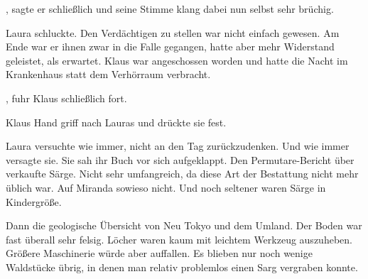 \par

, sagte er schließlich und seine Stimme klang dabei nun selbst sehr brüchig.

\par

Laura schluckte. Den Verdächtigen zu stellen war nicht einfach gewesen. Am Ende war er ihnen zwar in die Falle gegangen, hatte aber mehr Widerstand geleistet, als erwartet. Klaus war angeschossen worden und hatte die Nacht im Krankenhaus statt dem Verhörraum verbracht.

\par

, fuhr Klaus schließlich fort. 

\par

Klaus Hand griff nach Lauras und drückte sie fest. 

\par

Laura versuchte wie immer, nicht an den Tag zurückzudenken. Und wie immer versagte sie. Sie sah ihr Buch vor sich aufgeklappt. Den Permutare-Bericht über verkaufte Särge. Nicht sehr umfangreich, da diese Art der Bestattung nicht mehr üblich war. Auf Miranda sowieso nicht. Und noch seltener waren Särge in Kindergröße.

\par

Dann die geologische Übersicht von Neu Tokyo und dem Umland. Der Boden war fast überall sehr felsig. Löcher waren kaum mit leichtem Werkzeug auszuheben. Größere Maschinerie würde aber auffallen. Es blieben nur noch wenige Waldstücke übrig, in denen man relativ problemlos einen Sarg vergraben konnte.

\par

